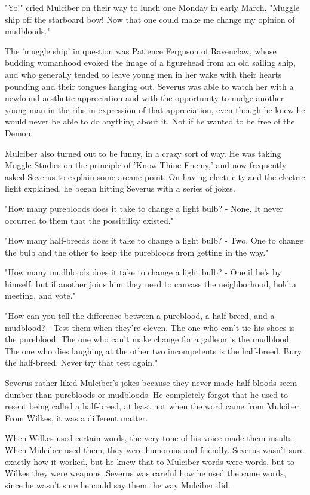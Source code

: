 \documentclass[a4paper,11pt]{article}
\begin{document}
"Yo!" cried Mulciber on their way to lunch one Monday in early March. "Muggle ship off the starboard bow! Now that one could make me change my opinion of mudbloods."

The 'muggle ship' in question was Patience Ferguson of Ravenclaw, whose budding womanhood evoked the image of a figurehead from an old sailing ship, and who generally tended to leave young men in her wake with their hearts pounding and their tongues hanging out. Severus was able to watch her with a newfound aesthetic appreciation and with the opportunity to nudge another young man in the ribs in expression of that appreciation, even though he knew he would never be able to do anything about it. Not if he wanted to be free of the Demon.

Mulciber also turned out to be funny, in a crazy sort of way. He was taking Muggle Studies on the principle of 'Know Thine Enemy,' and now frequently asked Severus to explain some arcane point. On having electricity and the electric light explained, he began hitting Severus with a series of jokes.

"How many purebloods does it take to change a light bulb? - None. It never occurred to them that the possibility existed."

"How many half-breeds does it take to change a light bulb? - Two. One to change the bulb and the other to keep the purebloods from getting in the way."

"How many mudbloods does it take to change a light bulb? - One if he's by himself, but if another joins him they need to canvass the neighborhood, hold a meeting, and vote."

"How can you tell the difference between a pureblood, a half-breed, and a mudblood? - Test them when they're eleven. The one who can't tie his shoes is the pureblood. The one who can't make change for a galleon is the mudblood. The one who dies laughing at the other two incompetents is the half-breed. Bury the half-breed. Never try that test again."

Severus rather liked Mulciber's jokes because they never made half-bloods seem dumber than purebloods or mudbloods. He completely forgot that he used to resent being called a half-breed, at least not when the word came from Mulciber. From Wilkes, it was a different matter.

When Wilkes used certain words, the very tone of his voice made them insults. When Mulciber used them, they were humorous and friendly. Severus wasn't sure exactly how it worked, but he knew that to Mulciber words were words, but to Wilkes they were weapons. Severus was careful how he used the same words, since he wasn't sure he could say them the way Mulciber did.
\end{document}
